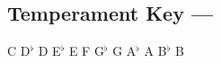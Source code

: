 \subsection[Temperament Key]{Temperament Key --- \UiKey{\I}\UiKey{\SET}}









































C
D${}^\flat$
D
E${}^\flat$
E
F
G${}^\flat$
G
A${}^\flat$
A
B${}^\flat$
B
